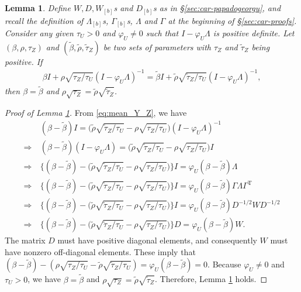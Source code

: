 \documentclass[11pt]{article}
\newtheorem{lemma}{Lemma}
\theoremstyle{definition}
\theoremstyle{remark}
\def\top{{ \mathrm{\scriptscriptstyle T} }}
\begin{document}
\begin{lemma}\label{lem:mean_Y_Z}
Define $W, D, W_{[b]}$s and $D_{[b]}$s
as in \S\ref{sec:car-papadogeorgu}, 
and recall the definition of $\Lambda_{[b]}$s,
$\Gamma_{[b]}$s, $\Lambda$ and $\Gamma$ at the beginning of \S\ref{sec:car-proofs}.
Consider any given $\tau_U>0$ and $\varphi_U \ne 0$ such that $I-\varphi_U \Lambda$ is positive definite. 
Let $(\beta, \rho, \tau_Z)$ and $(\tilde{\beta}, \tilde{\rho}, \tilde{\tau}_Z)$ be two sets of parameters with $\tau_Z$ and $\tilde{\tau}_Z$ being positive. 
If 
\begin{align}\label{eq:mean_Y_Z}
    \beta I + \rho \sqrt{\tau_Z/\tau_U} (I-\varphi_U \Lambda)^{-1} 
    = 
    \tilde{\beta} I + \tilde{\rho} \sqrt{\tilde{\tau}_Z/\tau_U} (I-\varphi_U \Lambda)^{-1}, 
\end{align}
then $\beta = \tilde{\beta}$ and $\rho \sqrt{\tau_Z} = \tilde{\rho} \sqrt{\tilde{\tau}_Z}$. 
\end{lemma}

\begin{proof}[Proof of Lemma \ref{lem:mean_Y_Z}]
From \eqref{eq:mean_Y_Z}, we have 
\begin{align*}
    & (\beta - \tilde{\beta}) I 
    = 
    \Big(\tilde{\rho} \sqrt{\tilde{\tau}_Z/\tau_U}- \rho \sqrt{\tau_Z/\tau_U} \Big) (I-\varphi_U \Lambda)^{-1}
    \\
    \Longrightarrow \ & 
    (\beta - \tilde{\beta}) (I-\varphi_U \Lambda)
    = \big( \tilde{\rho} \sqrt{\tilde{\tau}_Z/\tau_U}- \rho \sqrt{\tau_Z/\tau_U} \big) I 
    \\
    \Longrightarrow \ & 
    \big\{ (\beta - \tilde{\beta}) - \big(\tilde{\rho} \sqrt{\tilde{\tau}_Z/\tau_U}- \rho \sqrt{\tau_Z/\tau_U} \big) \big\} I
    = \varphi_U (\beta - \tilde{\beta}) \Lambda
    \\
    \Longrightarrow \ & 
    \big\{ (\beta - \tilde{\beta}) - \big(\tilde{\rho} \sqrt{\tilde{\tau}_Z/\tau_U}- \rho \sqrt{\tau_Z/\tau_U} \big) \big\} I
    = \varphi_U (\beta - \tilde{\beta}) \Gamma \Lambda \Gamma^\top
    \\
    \Longrightarrow \ & 
    \big\{ (\beta - \tilde{\beta}) - \big(\tilde{\rho} \sqrt{\tilde{\tau}_Z/\tau_U}- \rho \sqrt{\tau_Z/\tau_U} \big) \big\} I
    = \varphi_U (\beta - \tilde{\beta}) D^{-1/2} W D^{-1/2}
    \\
    \Longrightarrow \ & 
    \big\{ (\beta - \tilde{\beta}) - \big(\tilde{\rho} \sqrt{\tilde{\tau}_Z/\tau_U}- \rho \sqrt{\tau_Z/\tau_U} \big) \big\} D
    = \varphi_U (\beta - \tilde{\beta}) W.
\end{align*}
The matrix
$D$ must have positive diagonal elements, and consequently $W$ must have nonzero off-diagonal elements. 
These imply that $(\beta - \tilde{\beta}) - ( \rho \sqrt{\tau_Z/\tau_U} - \tilde{\rho} \sqrt{\tilde{\tau}_Z/\tau_U} ) = \varphi_U (\beta - \tilde{\beta}) = 0$.
Because $\varphi_U \ne 0$ and $\tau_U>0$,
we have 
$\beta = \tilde{\beta}$ and $\rho \sqrt{\tau_Z} = \tilde{\rho} \sqrt{\tilde{\tau}_Z}$. 
Therefore, Lemma \ref{lem:mean_Y_Z} holds. 
\end{proof}
\end{document}
